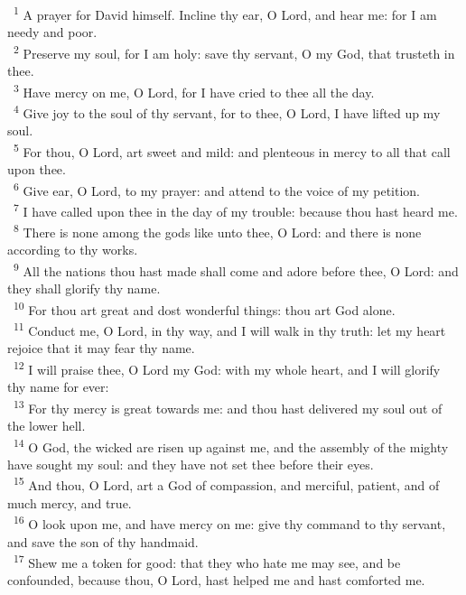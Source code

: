 \documentclass[a5paper,12pt]{article}
\begin{document}
\begin{multicols*}{2}
~\textsuperscript{1} A prayer for David himself. Incline thy ear, O Lord, and hear me: for I am needy and poor.\\
~\textsuperscript{2} Preserve my soul, for I am holy: save thy servant, O my God, that trusteth in thee.\\
~\textsuperscript{3} Have mercy on me, O Lord, for I have cried to thee all the day.\\
~\textsuperscript{4} Give joy to the soul of thy servant, for to thee, O Lord, I have lifted up my soul.\\
~\textsuperscript{5} For thou, O Lord, art sweet and mild: and plenteous in mercy to all that call upon thee.\\
~\textsuperscript{6} Give ear, O Lord, to my prayer: and attend to the voice of my petition.\\
~\textsuperscript{7} I have called upon thee in the day of my trouble: because thou hast heard me.\\
~\textsuperscript{8} There is none among the gods like unto thee, O Lord: and there is none according to thy works.\\
~\textsuperscript{9} All the nations thou hast made shall come and adore before thee, O Lord: and they shall glorify thy name.\\
~\textsuperscript{10} For thou art great and dost wonderful things: thou art God alone.\\
~\textsuperscript{11} Conduct me, O Lord, in thy way, and I will walk in thy truth: let my heart rejoice that it may fear thy name.\\
~\textsuperscript{12} I will praise thee, O Lord my God: with my whole heart, and I will glorify thy name for ever:\\
~\textsuperscript{13} For thy mercy is great towards me: and thou hast delivered my soul out of the lower hell.\\
~\textsuperscript{14} O God, the wicked are risen up against me, and the assembly of the mighty have sought my soul: and they have not set thee before their eyes.\\
~\textsuperscript{15} And thou, O Lord, art a God of compassion, and merciful, patient, and of much mercy, and true.\\
~\textsuperscript{16} O look upon me, and have mercy on me: give thy command to thy servant, and save the son of thy handmaid.\\
~\textsuperscript{17} Shew me a token for good: that they who hate me may see, and be confounded, because thou, O Lord, hast helped me and hast comforted me.\\


\end{multicols*}
\end{document}
